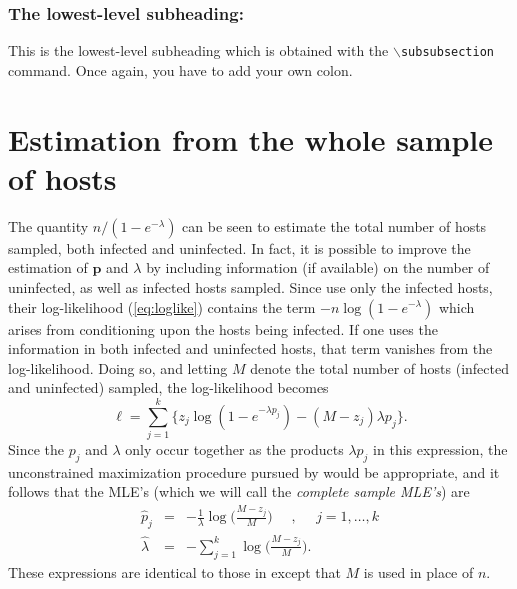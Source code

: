 \documentclass[12pt,titlepage]{article}
\newcommand{\bp}{\mathbf{p}}
\begin{document}
\subsubsection{The lowest-level subheading:}  This is the lowest-level subheading which
is obtained with the $\backslash$\texttt{subsubsection} command.  Once again, you have
to add your own colon.  

\section{Estimation from the whole sample of hosts}
The quantity $n/(1-e^{-\lambda})$ can be seen to estimate the total number
of hosts sampled, both infected and uninfected.  In fact, it is possible
to improve the estimation of $\bp$ and
$\lambda$ by including information (if available) on the number
of uninfected, as well as infected hosts sampled.  
Since  use only the infected hosts, their log-likelihood
(\ref{eq:loglike}) contains the term $-n\log(1-e^{-\lambda})$ which arises from
conditioning upon the hosts being infected.  If one uses the information in both
infected and uninfected hosts, that term vanishes from the log-likelihood.  
 Doing so, and letting
$M$ denote the total number of hosts (infected and uninfected) sampled, the
log-likelihood becomes
\[
\ell = \sum_{j=1}^k
\{z_j \log(1-e^{-\lambda p_j}) - (M-z_j)\lambda p_j\}.
\]
Since the $p_j$ and $\lambda$ only occur together as the products
$\lambda p_j$ in this expression, the unconstrained maximization
procedure pursued by  would be appropriate, and it
follows that the MLE's (which we will call the {\em complete sample MLE's}) are
\begin{eqnarray}
\hat{p}_j & = &  -\frac{1}{\lambda} \log\biggl( \frac{ M
- z_j}{M}\biggr)~~~~~~,~~~~~~j = 1,\ldots,k
\label{eq:phatU}   
 \\
\hat{\lambda} & = & -\sum_{j=1}^k \log \biggl( \frac{ M -
z_j}{M}\biggr).
\label{eq:lambdahatU}
\end{eqnarray}
These expressions are identical to those in  except that $M$ is
used in place of $n$.
\end{document}
